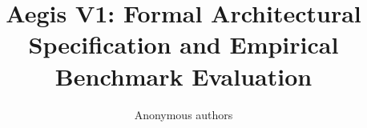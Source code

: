 \title{\textbf{Aegis V1: Formal Architectural Specification and Empirical Benchmark Evaluation}}

\author{Anonymous authors}

